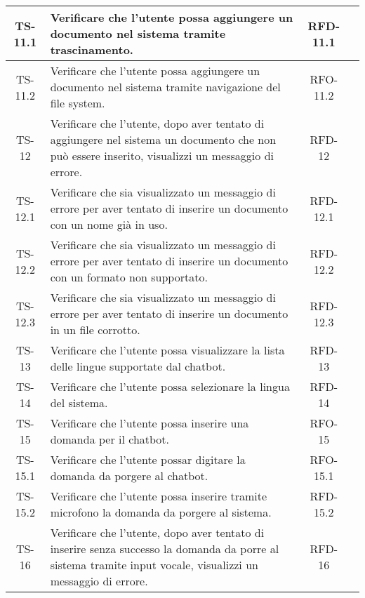 \begin{xltabular}{\textwidth}{| c | X | c | c |}
    \hline
    TS-11.1 & Verificare che l’utente possa aggiungere un documento nel sistema tramite trascinamento. & RFD-11.1 & \textcolor{xmarkcolor}{} \\
    \hline
    TS-11.2 & Verificare che l’utente possa aggiungere un documento nel sistema tramite navigazione del file system. & RFO-11.2 & \textcolor{xmarkcolor}{} \\
    \hline
    TS-12 & Verificare che l’utente, dopo aver tentato di aggiungere nel sistema un documento che non può essere inserito, visualizzi un messaggio di errore. & RFD-12 & \textcolor{xmarkcolor}{} \\
    \hline
    TS-12.1 & Verificare che sia visualizzato un messaggio di errore per aver tentato di inserire un documento con un nome già in uso. & RFD-12.1 & \textcolor{xmarkcolor}{} \\
    \hline
    TS-12.2 & Verificare che sia visualizzato un messaggio di errore per aver tentato di inserire un documento con un formato non supportato. & RFD-12.2 & \textcolor{xmarkcolor}{} \\
    \hline
    TS-12.3 & Verificare che sia visualizzato un messaggio di errore per aver tentato di inserire un documento in un file corrotto. & RFD-12.3 & \textcolor{xmarkcolor}{} \\
    \hline
    TS-13 & Verificare che l’utente possa visualizzare la lista delle lingue supportate dal chatbot. & RFD-13 & \textcolor{xmarkcolor}{} \\
    \hline
    TS-14 & Verificare che l’utente possa selezionare la lingua del sistema. & RFD-14 & \textcolor{xmarkcolor}{} \\
    \hline
    TS-15 & Verificare che l’utente possa inserire una domanda per il chatbot. & RFO-15 & \textcolor{xmarkcolor}{} \\
    \hline
    TS-15.1 & Verificare che l'utente possar digitare la domanda da porgere al chatbot. & RFO-15.1 & \textcolor{xmarkcolor}{} \\
    \hline
    TS-15.2 & Verificare che l'utente possa inserire tramite microfono la domanda da porgere al sistema. & RFD-15.2 & \textcolor{xmarkcolor}{} \\
    \hline
    TS-16 & Verificare che l’utente, dopo aver tentato di inserire senza successo la domanda da porre al sistema tramite input vocale, visualizzi un messaggio di errore. & RFD-16 & \textcolor{xmarkcolor}{} \\

\end{xltabular}
